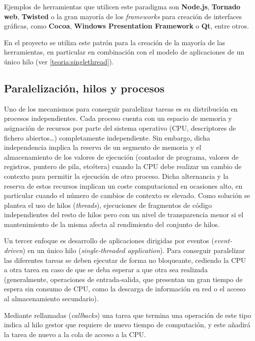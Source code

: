 Ejemplos de herramientas que utilicen este paradigma son \textbf{Node.js}, \textbf{Tornado web}, \textbf{Twisted} o la gran mayoría de los \textit{frameworks} para creación de interfaces gráficas, como \textbf{Cocoa}, \textbf{Windows Presentation Framework} o \textbf{Qt}, entre otros.

En el proyecto se utiliza este patrón para la creación de la mayoría de las herramientas, en particular en combinación con el modelo de aplicaciones de un único hilo (ver \ref{teoria:singlethread}).

\subsection{Paralelización, hilos y procesos}

Uno de los mecanismos para conseguir paralelizar tareas es su distribución en procesos independientes. Cada proceso cuenta con un espacio de memoria y asignación de recursos por parte del sistema operativo (CPU, descriptores de fichero abiertos\dots) completamente independiente. Sin embargo, dicha independencia implica la reserva de un segmento de memoria y el almacenamiento de los valores de ejecución (contador de programa, valores de registros, puntero de pila, etcétera) cuando la CPU debe realizar un cambio de contexto para permitir la ejecución de otro proceso. Dicha alternancia y la reserva de estos recursos implican un coste computacional en ocasiones alto, en particular cuando el número de cambios de contexto es elevado. Como solución se plantea el uso de hilos (\textit{threads}), ejecuciones de fragmentos de código independientes del resto de hilos pero con un nivel de transparencia menor si el mantenimiento de la misma afecta al rendimiento del conjunto de hilos.

\label{teoria:singlethread}
Un tercer enfoque es desarrollo de aplicaciones dirigidas por eventos (\textit{event-driven}) en un único hilo (\textit{single-threaded application}). Para conseguir paralelizar las diferentes tareas se deben ejecutar de forma no bloqueante, cediendo la CPU a otra tarea en caso de que se deba esperar a que otra sea realizada (generalmente, operaciones de entrada-salida, que presentan un gran tiempo de espera sin consumo de CPU, como la descarga de información en red o el acceso al almacenamiento secundario).

Mediante rellamadas (\textit{callbacks}) una tarea que termina una operación de este tipo indica al hilo gestor que requiere de nuevo tiempo de computación, y este añadirá la tarea de nuevo a la cola de acceso a la CPU.

